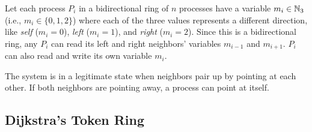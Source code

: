 
Let each process $P_i$ in a bidirectional ring of $n$ processes have a variable $m_i\in \mathbb{N}_3$ (i.e., $m_i\in \{0,1,2\}$) where each of the three values represents a different direction, like {\it self} ($m_i=0$), {\it left} ($m_i=1$), and {\it right} ($m_i=2$).
Since this is a bidirectional ring, any $P_i$ can read its left and right neighbors' variables $m_{i-1}$ and $m_{i+1}$.
$P_i$ can also read and write its own variable $m_i$.

The system is in a legitimate state when neighbors pair up by pointing at each other.
If both neighbors are pointing away, a process can point at itself.


\subsection{Dijkstra's Token Ring \cite{dij}}

